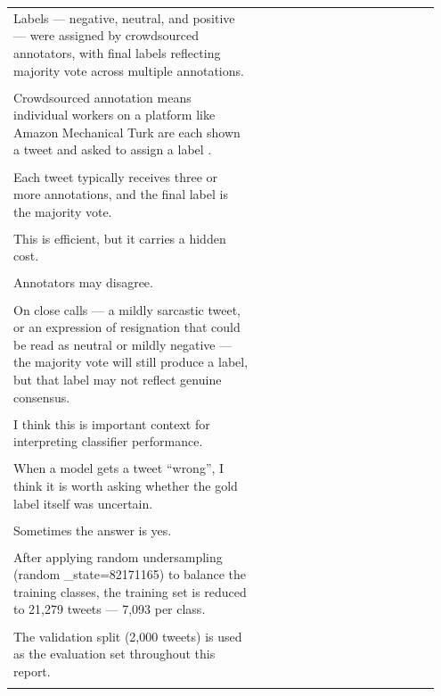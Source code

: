 \documentclass[11pt]{article}
\begin{document}
\begin{longtable}{|p{0.55\linewidth}|p{0.40\linewidth}|}
\hline
\rule{0pt}{3.5cm} & \\
\hline
Labels --- negative, neutral, and positive --- were assigned by crowdsourced annotators, with final labels reflecting majority vote across multiple annotations. & \\[2pt]
\hline
\rule{0pt}{3.5cm} & \\
\hline
Crowdsourced annotation means individual workers on a platform like Amazon Mechanical Turk are each shown a tweet and asked to assign a label . & \\[2pt]
\hline
\rule{0pt}{3.5cm} & \\
\hline
Each tweet typically receives three or more annotations, and the final label is the majority vote. & \\[2pt]
\hline
\rule{0pt}{3.5cm} & \\
\hline
This is efficient, but it carries a hidden cost. & \\[2pt]
\hline
\rule{0pt}{3.5cm} & \\
\hline
Annotators may disagree. & \\[2pt]
\hline
\rule{0pt}{3.5cm} & \\
\hline
On close calls --- a mildly sarcastic tweet, or an expression of resignation that could be read as neutral or mildly negative --- the majority vote will still produce a label, but that label may not reflect genuine consensus. & \\[2pt]
\hline
\rule{0pt}{3.5cm} & \\
\hline
I think this is important context for interpreting classifier performance. & \\[2pt]
\hline
\rule{0pt}{3.5cm} & \\
\hline
When a model gets a tweet ``wrong'', I think it is worth asking whether the gold label itself was uncertain. & \\[2pt]
\hline
\rule{0pt}{3.5cm} & \\
\hline
Sometimes the answer is yes. & \\[2pt]
\hline
\rule{0pt}{3.5cm} & \\
\hline
After applying random undersampling (random \_state=82171165) to balance the training classes, the training set is reduced to 21,279 tweets --- 7,093 per class. & \\[2pt]
\hline
\rule{0pt}{3.5cm} & \\
\hline
The validation split (2,000 tweets) is used as the evaluation set throughout this report. & \\[2pt]
\hline
\rule{0pt}{3.5cm} & \\

\end{longtable}
\end{document}
